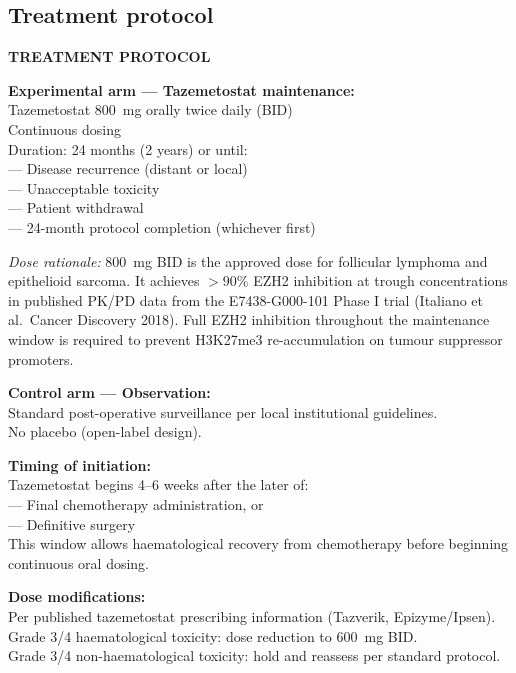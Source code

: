 \documentclass[12pt, a4paper]{article}
\begin{document}
\subsection{Treatment protocol}

\begin{center}
\colorbox{lockbox}{
\begin{minipage}{0.85\textwidth}
\vspace{0.5em}
\textbf{TREATMENT PROTOCOL}

\medskip
\textbf{Experimental arm --- Tazemetostat maintenance:}\\
Tazemetostat 800~mg orally twice daily (BID)\\
Continuous dosing\\
Duration: 24 months (2 years) or until:\\
\quad --- Disease recurrence (distant or local)\\
\quad --- Unacceptable toxicity\\
\quad --- Patient withdrawal\\
\quad --- 24-month protocol completion (whichever first)

\medskip
\textit{Dose rationale:} 800~mg BID is the approved
dose for follicular lymphoma and epithelioid sarcoma.
It achieves $>90\%$ EZH2 inhibition at trough
concentrations in published PK/PD data from the
E7438-G000-101 Phase I trial (Italiano et al.\
Cancer Discovery 2018). Full EZH2 inhibition
throughout the maintenance window is required to
prevent H3K27me3 re-accumulation on tumour
suppressor promoters.

\medskip
\textbf{Control arm --- Observation:}\\
Standard post-operative surveillance per local
institutional guidelines.\\
No placebo (open-label design).

\medskip
\textbf{Timing of initiation:}\\
Tazemetostat begins 4--6 weeks after the later of:\\
\quad --- Final chemotherapy administration, or\\
\quad --- Definitive surgery\\
This window allows haematological recovery from
chemotherapy before beginning continuous oral
dosing.

\medskip
\textbf{Dose modifications:}\\
Per published tazemetostat prescribing information
(Tazverik, Epizyme/Ipsen).\\
Grade 3/4 haematological toxicity: dose reduction
to 600~mg BID.\\
Grade 3/4 non-haematological toxicity: hold and
reassess per standard protocol.
\vspace{0.5em}
\end{minipage}
}
\end{center}
\end{document}

